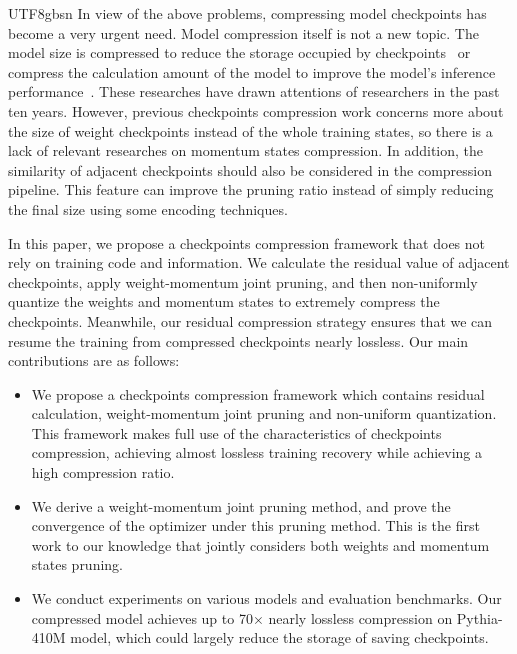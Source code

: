 \documentclass{article}
\theoremstyle{plain}
\theoremstyle{definition}
\theoremstyle{remark}
\begin{document}
\begin{CJK}{UTF8}{gbsn}
In view of the above problems, compressing model checkpoints has become a very urgent need. Model compression itself is not a new topic. The model size is compressed to reduce the storage occupied by checkpoints~\cite{han2015deep, hu2020delta, eisenman2022check, chen2020efficient, jin2023design, dynaquant} or compress the calculation amount of the model to improve the model's inference performance~\cite{networkslimming,tang2020scop, dettmers2022llm, xiao2023smoothquant, chen2022mtp, shu2023tinysam,wu2023ppt}. These researches have drawn attentions of researchers in the past ten years. However, previous checkpoints compression work concerns more about the size of weight checkpoints instead of the whole training states, so there is a lack of relevant researches on momentum states compression. In addition, the similarity of adjacent checkpoints should also be considered in the compression pipeline. This feature can improve the pruning ratio instead of simply reducing the final size using some encoding techniques.

In this paper, we propose a checkpoints compression framework that does not rely on training code and information. We calculate the residual value of adjacent checkpoints, apply weight-momentum joint pruning, and then non-uniformly quantize the weights and momentum states to extremely compress the checkpoints. Meanwhile, our residual compression strategy ensures that we can resume the training from compressed checkpoints nearly lossless. Our main contributions are as follows:
\begin{itemize}
    \item We propose a checkpoints compression framework which contains residual calculation, weight-momentum joint pruning and non-uniform quantization. This framework makes full use of the characteristics of checkpoints compression, achieving almost lossless training recovery while achieving a high compression ratio. 
    \item We derive a weight-momentum joint pruning method, and prove the convergence of the optimizer under this pruning method. This is the first work to our knowledge that jointly considers both weights and momentum states pruning.
    \item We conduct experiments on various models and evaluation benchmarks. Our compressed model achieves up to 70$\times$ nearly lossless compression on Pythia-410M model, which could largely reduce the storage of saving checkpoints.
\end{itemize}


\end{CJK}
\end{document}
